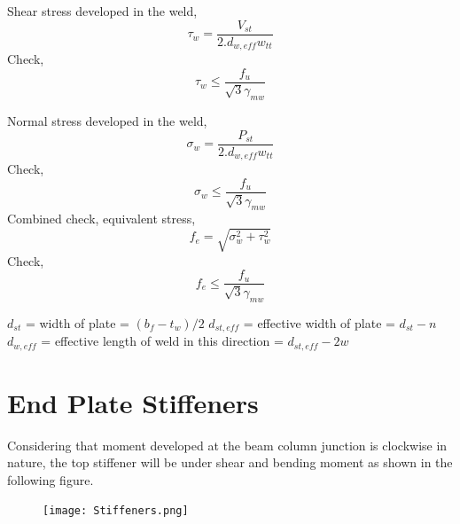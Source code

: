 \documentclass[11.5pt,a4paper,oneside]{report}
\begin{document}
\begin{Form}
%
Shear stress developed in the weld, 
\begin{equation*}
\tau_w = \frac{V_{st}}{2.d_{w,eff}w_{tt}}
\end{equation*}
\noindent
Check,
\begin{equation}
\tau_w \leq \frac{f_u}{\sqrt{3} \gamma_{mw}}
\end{equation}

\noindent
Normal stress developed in the weld, 
\begin{equation*}
\sigma_w = \frac{P_{st}}{2.d_{w,eff}w_{tt}}
\end{equation*}
\noindent
Check,
\begin{equation}
\sigma_w \leq \frac{f_u}{\sqrt{3} \gamma_{mw}}
\end{equation}
\noindent
Combined check, equivalent stress,
\begin{equation*}
f_e = \sqrt{\sigma_w^2 + \tau_w^2}
\end{equation*}
\noindent
Check,
\begin{equation}
f_e \leq \frac{f_u}{\sqrt{3} \gamma_{mw}}
\end{equation}


\indent $d_{st}$ = width of plate = $(b_f-t_w)/2$
\indent $d_{st,eff}$ = effective width of plate = $d_{st} - n$ \\
\indent $d_{w,eff}$ = effective length of weld in this direction = $d_{st,eff} - 2w$ \\

\pagebreak
\section{End Plate Stiffeners}
Considering that moment developed at the beam column junction is clockwise in nature, the top stiffener will be under shear and bending moment as shown in the following figure.\\

\begin{figure}[ht]
	\centering
	\texttt{[image: Stiffeners.png]}
\end{figure}




\end{Form}
\end{document}
